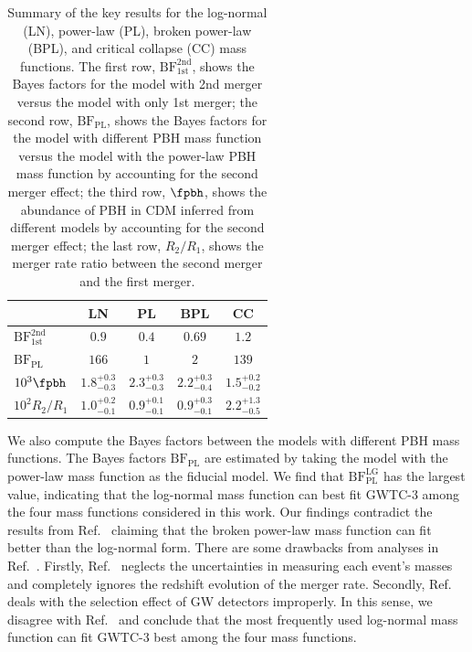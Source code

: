 \documentclass[
reprint,           %
superscriptaddress,%
amsmath,           %
amssymb,           %
aps,               %
prd,               %
notitlepage,       %
longbibliography,  %
floatfix,          %
nofootinbib,
]{revtex4-1}
\begin{document}
\begin{table}[tbp!]
	\centering
	\begin{tabular}{l|c|c|c|c}
		\hline\hline
		& LN & PL & BPL & CC \\
		\hline
		$\mathrm{BF}^{\mathrm{2nd}}_{\mathrm{1st}}$ & $0.9$ & $0.4$ & $0.69$ & $1.2$ \\
		$\mathrm{BF}_{\mathrm{PL}}$ & $166$ & $1$ & $2$ & $139$ \\
		$10^{3}\fpbh$ & $1.8^{+0.3}_{-0.3}$ & $2.3^{+0.3}_{-0.3}$ & $2.2^{+0.3}_{-0.4}$ & $1.5^{+0.2}_{-0.2}$ \\
		$10^{2}R_2/R_1$ & $1.0^{+0.2}_{-0.1}$ & $0.9^{+0.1}_{-0.1}$ & $0.9^{+0.3}_{-0.1}$ & $2.2^{+1.3}_{-0.5}$ \\
		\hline
	\end{tabular}
	\caption{\label{table:BF}Summary of the key results for the log-normal (LN), power-law (PL), broken power-law (BPL), and critical collapse (CC) mass functions. The first row, $\mathrm{BF}^{\mathrm{2nd}}_{\mathrm{1st}}$, shows the Bayes factors for the model with 2nd merger versus the model with only 1st merger; the second row, $\mathrm{BF}_{\mathrm{PL}}$, shows the Bayes factors for the model with different PBH mass function versus the model with the power-law PBH mass function by accounting for the second merger effect; the third row, $\fpbh$, shows the abundance of PBH in CDM inferred from different models by accounting for the second merger effect; the last row, $R_2/R_1$, shows the merger rate ratio between the second merger and the first merger.}
\end{table}

We also compute the Bayes factors between the models with different PBH mass functions. The Bayes factors $\mathrm{BF}_{\mathrm{PL}}$ are estimated by taking the model with the power-law mass function as the fiducial model. 
We find that $\mathrm{BF}_{\mathrm{PL}}^{\mathrm{LG}}$ has the largest value, indicating that the log-normal mass function can best fit GWTC-3 among the four mass functions considered in this work. Our findings contradict the results from Ref.~\cite{Deng:2021ezy} claiming that the broken power-law mass function can fit better than the log-normal form. There are some drawbacks from analyses in Ref.~\cite{Deng:2021ezy}. Firstly, Ref.~\cite{Deng:2021ezy} neglects the uncertainties in measuring each event's masses and completely ignores the redshift evolution of the merger rate. Secondly, Ref.~\cite{Deng:2021ezy} deals with the selection effect of GW detectors improperly. In this sense, we disagree with Ref.~\cite{Deng:2021ezy} and conclude that the most frequently used log-normal mass function can fit GWTC-3 best among the four mass functions.
\end{document}
